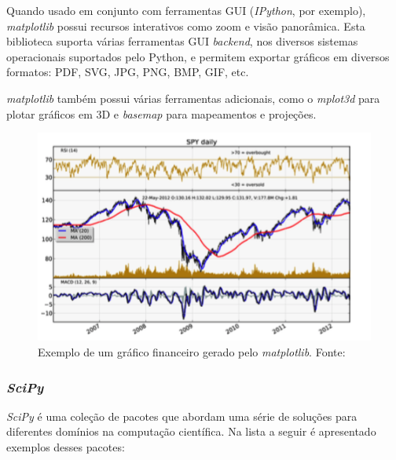 Quando usado em conjunto com ferramentas GUI (\textit{IPython}, por exemplo), \textit{matplotlib} possui recursos interativos como zoom e visão panorâmica. Esta biblioteca suporta várias ferramentas GUI \textit{backend}, nos diversos sistemas operacionais suportados pelo Python, e permitem exportar gráficos em diversos formatos: PDF, SVG, JPG, PNG, BMP, GIF, etc.

\textit{matplotlib} também possui várias ferramentas adicionais, como o \textit{mplot3d} para plotar gráficos em 3D e \textit{basemap} para mapeamentos e projeções.

\begin{figure}[h]
  \includegraphics{Cap4/imagens/matplotlib-finc}
  \caption{Exemplo de um gráfico financeiro gerado pelo \textit{matplotlib}. Fonte: }
  \label{matplotlib-fig}
\end{figure}


\subsubsection{\textit{SciPy}}
\textit{SciPy} é uma coleção de pacotes que abordam uma série de soluções para diferentes domínios na computação científica. Na lista a seguir é apresentado exemplos desses pacotes: \cite{python-analysis}

